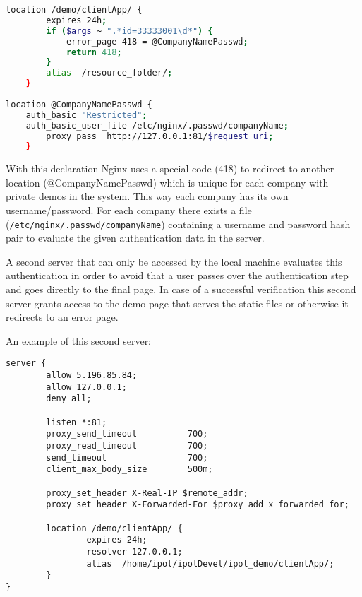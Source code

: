 \begin{lstlisting}[language=Bash]
location /demo/clientApp/ {
        expires 24h;
        if ($args ~ ".*id=33333001\d*") {
            error_page 418 = @CompanyNamePasswd;
            return 418;
        }
        alias  /resource_folder/;
    }
    
location @CompanyNamePasswd {
	auth_basic "Restricted";
	auth_basic_user_file /etc/nginx/.passwd/companyName;
        proxy_pass  http://127.0.0.1:81/$request_uri;
    }
 \end{lstlisting}

With this declaration Nginx uses a special code (418) to redirect to another location (@CompanyNamePasswd) which is unique for each 
company with private demos in the system. This way each company has its own username/password. For each company there exists a file
({\tt /etc/nginx/.passwd/companyName}) containing a username and password hash pair to evaluate the given authentication data in the server.

A second server that can only be accessed by the local machine evaluates this authentication in order to avoid that a user passes over the authentication step and goes directly to the final page. In case of a successful verification this second server grants access to the demo page that serves the static files or otherwise it redirects to an error page.

An example of this second server:
\begin{lstlisting}
server {
        allow 5.196.85.84;
        allow 127.0.0.1;
        deny all;

        listen *:81;
        proxy_send_timeout          700;
        proxy_read_timeout          700;
        send_timeout                700;
        client_max_body_size        500m;

        proxy_set_header X-Real-IP $remote_addr;
        proxy_set_header X-Forwarded-For $proxy_add_x_forwarded_for;

        location /demo/clientApp/ {
                expires 24h;
                resolver 127.0.0.1;
                alias  /home/ipol/ipolDevel/ipol_demo/clientApp/;
        }
}
\end{lstlisting}
